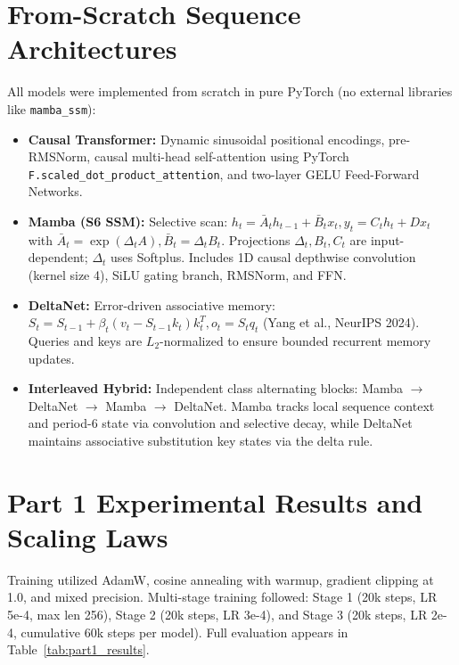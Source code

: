 \documentclass[12pt,a4paper]{article}
\begin{document}
\section{From-Scratch Sequence Architectures}
All models were implemented from scratch in pure PyTorch (no external libraries like \texttt{mamba\_ssm}):
\begin{itemize}[leftmargin=*]
    \item \textbf{Causal Transformer:} Dynamic sinusoidal positional encodings, pre-RMSNorm, causal multi-head self-attention using PyTorch \texttt{F.scaled\_dot\_product\_attention}, and two-layer GELU Feed-Forward Networks.
    \item \textbf{Mamba (S6 SSM):} Selective scan: $h_t = \bar{A}_t h_{t-1} + \bar{B}_t x_t, y_t = C_t h_t + D x_t$ with $\bar{A}_t = \exp(\Delta_t A), \bar{B}_t = \Delta_t B_t$. Projections $\Delta_t, B_t, C_t$ are input-dependent; $\Delta_t$ uses Softplus. Includes 1D causal depthwise convolution (kernel size 4), SiLU gating branch, RMSNorm, and FFN.
    \item \textbf{DeltaNet:} Error-driven associative memory: $S_t = S_{t-1} + \beta_t (v_t - S_{t-1} k_t) k_t^T, o_t = S_t q_t$ (Yang et al., NeurIPS 2024). Queries and keys are $L_2$-normalized to ensure bounded recurrent memory updates.
    \item \textbf{Interleaved Hybrid:} Independent class alternating blocks: Mamba $\to$ DeltaNet $\to$ Mamba $\to$ DeltaNet. Mamba tracks local sequence context and period-6 state via convolution and selective decay, while DeltaNet maintains associative substitution key states via the delta rule.
\end{itemize}

\section{Part 1 Experimental Results and Scaling Laws}
Training utilized AdamW, cosine annealing with warmup, gradient clipping at 1.0, and mixed precision. Multi-stage training followed: Stage 1 (20k steps, LR 5e-4, max len 256), Stage 2 (20k steps, LR 3e-4), and Stage 3 (20k steps, LR 2e-4, cumulative 60k steps per model). Full evaluation appears in Table~\ref{tab:part1_results}.
\end{document}
